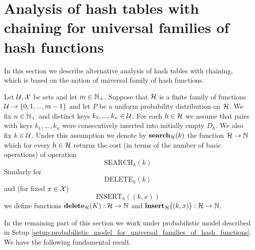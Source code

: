 \section{Analysis of hash tables with chaining for universal families of hash functions}
\noindent
In this section we describe alternative analysis of hash tables with chaining, which is based on the notion of universal family of hash functions.

\begin{setup}\label{setup:probabilistic_model_for_universal_families_of_hash_functions}
Let ${\mathcal U},{\mathcal X}$ be sets and let $m\in {\mathbb N}_+$. Suppose that ${\mathcal H}$ is a finite family of functions ${\mathcal U}\rightarrow \{0,1,...,m-1\}$ and let $P$ be a uniform probability distribution on ${\mathcal H}$. We fix $n\in {\mathbb N}_+$ and distinct keys $k_1,...,k_n\in {\mathcal U}$. For each $h\in {\mathcal H}$ we assume that pairs with keys $k_1,...,k_n$ were consecutively inserted into initially empty $D_h$. We also fix $k\in {\mathcal U}$. Under this assumption we denote by $\mathbf{search}_{\mathcal H}(k)$ the function ${\mathcal H}\rightarrow {\mathbb N}$ which for every $h\in {\mathcal H}$ returns the cost (in terms of the number of basic operations) of operation 
$$\mathrm{SEARCH}_h(k)$$
Similarly for 
$$\mathrm{DELETE}_h(k)$$ 
and (for fixed $x\in {\mathcal X}$)
$$\mathrm{INSERT}_h\left((k,x)\right)$$
we define functions $\mathbf{delete}_{\mathcal H}(K):{\mathcal H} \rightarrow {\mathbb N}$ and $\mathbf{insert}_{\mathcal H}\big((k,x)\big):{\mathcal H} \rightarrow {\mathbb N}$.
\end{setup}
\noindent
In the remaining part of this section we work under probabilistic model described in Setup \ref{setup:probabilistic_model_for_universal_families_of_hash_functions}. We have the following fundamental result.

